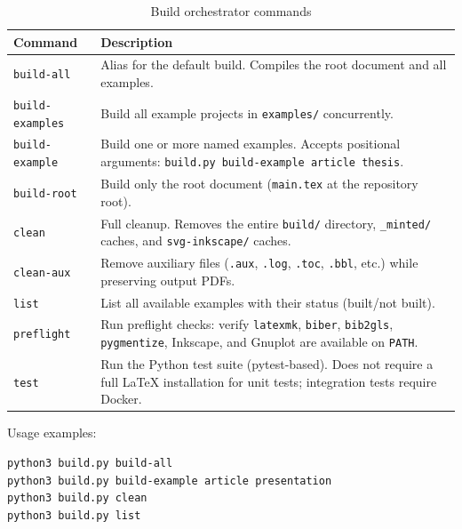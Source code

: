 \begin{table}[htbp]
    \centering
    \caption{Build orchestrator commands}
    \label{tab:build-commands}
    \begin{tabular}{@{} l p{8.5cm} @{}}
        \toprule
        \textbf{Command} & \textbf{Description} \\
        \midrule
        \texttt{build-all} &
            Alias for the default build.  Compiles the root document and all
            examples. \\[4pt]
        \texttt{build-examples} &
            Build all example projects in \texttt{examples/} concurrently. \\[4pt]
        \texttt{build-example} &
            Build one or more named examples.  Accepts positional arguments:
            \texttt{build.py build-example article thesis}. \\[4pt]
        \texttt{build-root} &
            Build only the root document (\texttt{main.tex} at the repository
            root). \\[4pt]
        \texttt{clean} &
            Full cleanup.  Removes the entire \texttt{build/} directory,
            \texttt{\_minted/} caches, and \texttt{svg-inkscape/} caches. \\[4pt]
        \texttt{clean-aux} &
            Remove auxiliary files (\texttt{.aux}, \texttt{.log}, \texttt{.toc},
            \texttt{.bbl}, etc.) while preserving output PDFs. \\[4pt]
        \texttt{list} &
            List all available examples with their status (built/not built). \\[4pt]
        \texttt{preflight} &
            Run preflight checks: verify \texttt{latexmk}, \texttt{biber},
            \texttt{bib2gls}, \texttt{pygmentize}, Inkscape, and Gnuplot are
            available on \texttt{PATH}. \\[4pt]
        \texttt{test} &
            Run the Python test suite (pytest-based).  Does not require a full
            \LaTeX{} installation for unit tests; integration tests require
            Docker. \\
        \bottomrule
    \end{tabular}
\end{table}

Usage examples:

\begin{verbatim}
python3 build.py build-all
python3 build.py build-example article presentation
python3 build.py clean
python3 build.py list
\end{verbatim}

